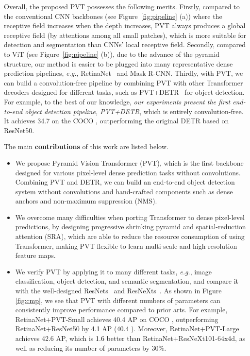 \documentclass[10pt,twocolumn,letterpaper]{article}
\def\eg{\emph{e.g.}}
\begin{document}
Overall, the proposed PVT possesses the following merits.
Firstly, compared to the conventional CNN backbones (see Figure~\ref{fig:pipeline} (a)) where the receptive field increases when the depth increases, PVT always produces a global receptive field (by attentions among all small patches), which is more suitable for detection and segmentation than CNNs' local receptive field.
Secondly, compared to ViT (see Figure~\ref{fig:pipeline} (b)), due to the advance of the pyramid structure, our method is easier to be plugged into many representative dense prediction pipelines, \eg, RetinaNet~\cite{lin2017focal} and Mask R-CNN.
Thirdly, with PVT, we can build a convolution-free pipeline by combining PVT with other Transformer decoders designed for different tasks, such as PVT+DETR~\cite{carion2020end} for object detection.
For example, to the best of our knowledge, \emph{our experiments present the first end-to-end object detection pipeline, PVT+DETR}, which is entirely convolution-free. It achieves 34.7 on the COCO , outperforming the original DETR based on ResNet50.

The main \textbf{contributions} of this work are listed below.
\begin{itemize}
    \item We propose Pyramid Vision Transformer (PVT), which is the first backbone designed for various pixel-level dense prediction tasks without convolutions. Combining PVT and DETR, we can build an end-to-end object detection system without convolutions and hand-crafted components such as dense anchors and non-maximum suppression (NMS).
    
    \item We overcome many difficulties when porting Transformer to dense pixel-level predictions, by designing 
progressive shrinking pyramid and spatial-reduction attention (SRA), which are able to reduce the resource consumption of using Transformer, making PVT flexible to learn multi-scale and high-resolution feature maps.
    
    \item We verify PVT by applying it to many different tasks, \eg,  image classification, object detection, and semantic segmentation, and compare it with the well-designed ResNets~\cite{he2016deep} and ResNeXts~\cite{xie2017aggregated}. As shown in Figure \ref{fig:cmp}, we see that PVT with different numbers of parameters can consistently improve performance compared to prior arts.
    For example, RetinaNet+PVT-Small achieves  40.4 AP on COCO , outperforming RetinaNet+ResNet50 by 4.1 AP (40.4 ). 
    Moreover, RetinaNet+PVT-Large achieves 42.6 AP, which is 1.6 better than RetinaNet+ResNeXt101-64x4d, as well as  reducing its number of parameters by 30\%.
\end{itemize}
\end{document}
